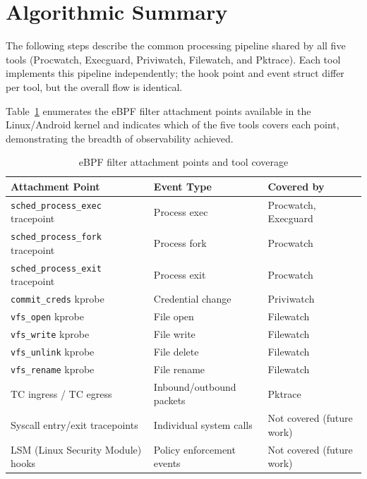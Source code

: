 \documentclass{mnitjaipur}
\begin{document}
\section{Algorithmic Summary}
The following steps describe the common processing pipeline shared by all five tools (Procwatch, Execguard, Priviwatch, Filewatch, and Pktrace). Each tool implements this pipeline independently; the hook point and event struct differ per tool, but the overall flow is identical.

Table~\ref{tab:hook-coverage} enumerates the eBPF filter attachment points available in the Linux/Android kernel and indicates which of the five tools covers each point, demonstrating the breadth of observability achieved.

\begin{table}[H]
  \centering
  \caption{eBPF filter attachment points and tool coverage}
  \label{tab:hook-coverage}
  \begin{tabular}{|p{}|p{}|p{}|}
    \hline
    \textbf{Attachment Point} & \textbf{Event Type} & \textbf{Covered by} \\ \hline
    \texttt{sched\_process\_exec} tracepoint & Process exec & Procwatch, Execguard \\ \hline
    \texttt{sched\_process\_fork} tracepoint & Process fork & Procwatch \\ \hline
    \texttt{sched\_process\_exit} tracepoint & Process exit & Procwatch \\ \hline
    \texttt{commit\_creds} kprobe & Credential change & Priviwatch \\ \hline
    \texttt{vfs\_open} kprobe & File open & Filewatch \\ \hline
    \texttt{vfs\_write} kprobe & File write & Filewatch \\ \hline
    \texttt{vfs\_unlink} kprobe & File delete & Filewatch \\ \hline
    \texttt{vfs\_rename} kprobe & File rename & Filewatch \\ \hline
    TC ingress / TC egress & Inbound/outbound packets & Pktrace \\ \hline
    Syscall entry/exit tracepoints & Individual system calls & Not covered (future work) \\ \hline
    LSM (Linux Security Module) hooks & Policy enforcement events & Not covered (future work) \\ \hline
  \end{tabular}
\end{table}
\end{document}
